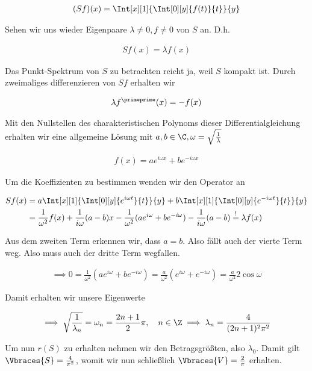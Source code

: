 \begin{solution}
\begin{align*}
  (Sf)(x)
  =
  \Int[x][1]{
    \Int[0][y]{f(t)}{t}
  }{y}
\end{align*}

Sehen wir uns wieder Eigenpaare $\lambda \neq 0, f \neq 0$ von $S$ an. D.h.

\begin{align*}
  Sf(x) = \lambda f(x)
\end{align*}

Das Punkt-Spektrum von $S$ zu betrachten reicht ja, weil $S$ kompakt ist.
Durch zweimaliges differenzieren von $S f$ erhalten wir

\begin{align*}
  \lambda f^\primeprime(x) = -f(x)
\end{align*}

Mit den Nullstellen des charakteristischen Polynoms dieser Differentialgleichung
erhalten wir eine allgemeine Lösung mit $a,b \in \C, \omega = \sqrt{\frac{1}{\lambda}}$

\begin{align*}
  f(x) = a e^{i\omega x} + b e^{-i \omega x}
\end{align*}

Um die Koeffizienten zu bestimmen wenden wir den Operator an

\begin{align*}
  Sf(x)
  & =
  a \Int[x][1]{
    \Int[0][y]{e^{i\omega t}}{t}
  }{y}
  +
  b \Int[x][1]{
      \Int[0][y]{e^{-i\omega t}}{t}
  }{y} \\
  & =
  \frac{1}{\omega^2} f(x)
  +
  \frac{1}{i\omega} (a-b)x
  -
  \frac{1}{\omega^2}(ae^{i\omega} + be^{-i\omega})
  -
  \frac{1}{i\omega}(a-b)
  \stackrel{!}{=}
  \lambda f(x)
\end{align*}

Aus dem zweiten Term erkennen wir, dass $a=b$.
Also fällt auch der vierte Term weg.
Also muss auch der dritte Term wegfallen.

\begin{align*}
  \implies
  0
  =
  \frac{1}{\omega^2}(ae^{i\omega} + be^{-i\omega})
  =
  \frac{a}{\omega^2}
  (e^{i\omega} + e^{-i\omega})
  =
  \frac{a}{\omega^2}
  2 \cos{\omega}
\end{align*}

Damit erhalten wir unsere Eigenwerte

\begin{align*}
  \implies
  \sqrt{\frac{1}{\lambda_n}}
  =
  \omega_n
  =
  \frac{2n+1}{2} \pi,
  \quad n \in \Z
  \implies
  \lambda_n
  =
  \frac{4}{(2n+1)^2 \pi^2}
\end{align*}

Um nun $r(S)$ zu erhalten nehmen wir den Betragsgrößten, also $\lambda_0$.
Damit gilt $\Vbraces{S} = \frac{4}{\pi^2}$, womit wir nun schließlich $\Vbraces{V} = \frac{2}{\pi}$ erhalten.

\end{solution}
